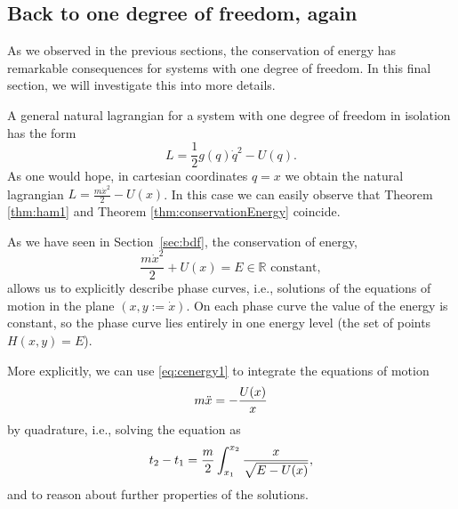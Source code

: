 \documentclass[english,fontsize=11pt,paper=a5,oneside]{scrbook}
\newcommand{\R}{\mathbb{R}}
\let\d\relax
\DeclareMathOperator{\d}{d}
\theoremstyle{definition}
\begin{document}


\subsection{Back to one degree of freedom, again}\label{sec:1deg-again}

As we observed in the previous sections, the conservation of energy has remarkable consequences for systems with one degree of freedom.
In this final section, we will investigate this into more details.

A general natural lagrangian for a system with one degree of freedom in isolation has the form
\begin{equation}
    L = \frac12 g(q)\dot q^2 - U(q).
\end{equation}
As one would hope, in cartesian coordinates $q = x$ we obtain the natural lagrangian $L = \frac{m \dot x^2}{2} - U(x)$.
In this case we can easily observe that Theorem \ref{thm:ham1} and Theorem \ref{thm:conservationEnergy} coincide.

As we have seen in Section~\ref{sec:bdf}, the conservation of energy,
\begin{equation}\label{eq:cenergy1}
    \frac{m \dot x^2}{2} + U(x) = E \in\R \mbox{ constant},
\end{equation}
allows us to explicitly describe phase curves, i.e., solutions of the equations of motion in the plane $(x, y := \dot x)$.
On each phase curve the value of the energy is constant, so the phase curve lies entirely in one energy level (the set of points $H(x,y)=E$).

More explicitly, we can use \eqref{eq:cenergy1} to integrate the equations of motion
\begin{equation}
    m \ddot x = - \frac{\d U(x)}{\d x}
\end{equation}
by quadrature, i.e., solving the equation as
\begin{equation}
    t_2 - t_1 = \frac m2 \int_{x_1}^{x_2} \frac{\d x}{\sqrt{E-U(x)}},
\end{equation}
and to reason about further properties of the solutions.
\end{document}
